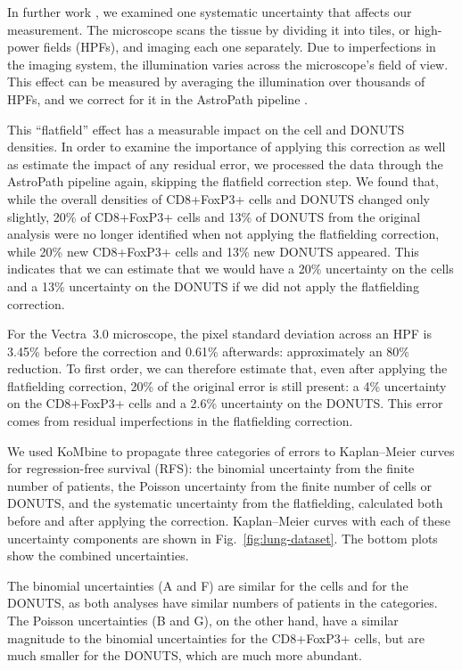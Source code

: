 \documentclass[pdflatex,sn-basic]{sn-jnl}%
\theoremstyle{thmstyleone}%
\theoremstyle{thmstyletwo}%
\theoremstyle{thmstylethree}%
\newcommand{\KM}{Kaplan--Meier} %
\begin{document}
In further work \citep{SITC2025}, we examined one systematic uncertainty that affects our measurement.  The microscope scans the tissue by dividing it into tiles, or high-power fields (HPFs), and imaging each one separately.  Due to imperfections in the imaging system, the illumination varies across the microscope's field of view.  This effect can be measured by averaging the illumination over thousands of HPFs, and we correct for it in the AstroPath pipeline \citep{astropathscience}.

This ``flatfield'' effect has a measurable impact on the cell and DONUTS densities.  In order to examine the importance of applying this correction as well as estimate the impact of any residual error, we processed the data through the AstroPath pipeline again, skipping the flatfield correction step.  We found that, while the overall densities of CD8+FoxP3+ cells and DONUTS changed only slightly, 20\% of CD8+FoxP3+ cells and 13\% of DONUTS from the original analysis were no longer identified when not applying the flatfielding correction, while 20\% new CD8+FoxP3+ cells and 13\% new DONUTS appeared.  This indicates that we can estimate that we would have a 20\% uncertainty on the cells and a 13\% uncertainty on the DONUTS if we did not apply the flatfielding correction.

For the Vectra~3.0 microscope, the pixel standard deviation across an HPF is 3.45\% before the correction and 0.61\% afterwards: approximately an 80\% reduction.  To first order, we can therefore estimate that, even after applying the flatfielding correction, 20\% of the original error is still present: a 4\% uncertainty on the CD8+FoxP3+ cells and a 2.6\% uncertainty on the DONUTS\@.  This error comes from residual imperfections in the flatfielding correction.

We used KoMbine to propagate three categories of errors to \KM{} curves for regression-free survival (RFS)\@: the binomial uncertainty from the finite number of patients, the Poisson uncertainty from the finite number of cells or DONUTS, and the systematic uncertainty from the flatfielding, calculated both before and after applying the correction.  \KM{} curves with each of these uncertainty components are shown in Fig.~\ref{fig:lung-dataset}.  The bottom plots show the combined uncertainties.

The binomial uncertainties (A and F) are similar for the cells and for the DONUTS\@, as both analyses have similar numbers of patients in the categories. The Poisson uncertainties (B and G), on the other hand, have a similar magnitude to the binomial uncertainties for the CD8+FoxP3+ cells, but are much smaller for the DONUTS, which are much more abundant.
\end{document}
